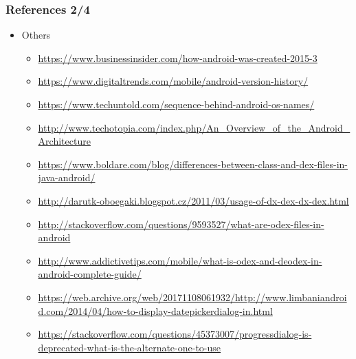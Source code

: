 \documentclass[10pt,xcolor=pdflatex]{beamer}
\begin{document}
\begin{frame}[fragile]\frametitle{References 2/4}
\begin{itemize}
    \item Others
      \begin{itemize}
        \footnotesize
        \item \url{https://www.businessinsider.com/how-android-was-created-2015-3}
        \item \url{https://www.digitaltrends.com/mobile/android-version-history/}
        \item \url{https://www.techuntold.com/sequence-behind-android-os-names/}
        \item \url{http://www.techotopia.com/index.php/An_Overview_of_the_Android_Architecture}
        \item \url{https://www.boldare.com/blog/differences-between-class-and-dex-files-in-java-android/}
        \item \url{http://darutk-oboegaki.blogspot.cz/2011/03/usage-of-dx-dex-dx-dex.html}
        \item \url{http://stackoverflow.com/questions/9593527/what-are-odex-files-in-android}
        \item \url{http://www.addictivetips.com/mobile/what-is-odex-and-deodex-in-android-complete-guide/}
        \item \url{https://web.archive.org/web/20171108061932/http://www.limbaniandroid.com/2014/04/how-to-display-datepickerdialog-in.html}
        \item \url{https://stackoverflow.com/questions/45373007/progressdialog-is-deprecated-what-is-the-alternate-one-to-use}
        \normalsize
      \end{itemize}
\end{itemize}
\end{frame}
\end{document}
